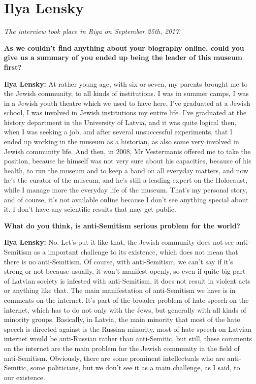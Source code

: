 \section{Ilya Lensky}

\textit{The interview took place in Riga on September 25th, 2017}.\par
\vspace*{2em}
\textbf{As we couldn’t find anything about your biography online, could you give us a summary of you ended up being the leader of this museum first?}

\textbf{Ilya Lensky:} At rather young age, with six or seven, my parents brought me to the Jewish community, to all kinds of institutions. I was in summer camps, I was in a Jewish youth theatre which we used to have here, I’ve graduated at a Jewish school, I was involved in Jewish institutions my entire life. I’ve graduated at the history department in the University of Latvia, and it was quite logical then, when I was seeking a job, and after several unsuccessful experiments, that I ended up working in the museum as a historian, as also some very involved in Jewish community life. And then, in 2008, Mr Vestermanis offered me to take the position, because he himself was not very sure about his capacities, because of his health, to run the museum and to keep a hand on all everyday matters, and now he’s the curator of the museum, and he’s still a leading expert on the Holocaust, while I manage more the everyday life of the museum. That’s my personal story, and of course, it’s not available online because I don’t see anything special about it. I don’t have any scientific results that may get public. 

\textbf{What do you think, is anti-Semitism serious problem for the world?}

\textbf{Ilya Lensky:} No. Let’s put it like that, the Jewish community does not see anti-Semitism as a important challenge to its existence, which does not mean that there is no anti-Semitism. Of course, with anti-Semitism, we can’t say if it’s strong or not because usually, it won’t manifest openly, so even if quite big part of Latvian society is infested with anti-Semitism, it does not result in violent acts or anything like that. The main manifestation of anti-Semitism we have is in comments on the internet. It’s part of the broader problem of hate speech on the internet, which has to do not only with the Jews, but generally with all kinds of minority groups. Basically, in Latvia, the main minority that most of the hate speech is directed against is the Russian minority, most of hate speech on Latvian internet would be anti-Russian rather than anti-Semitic, but still, these comments on the internet are the main problem for the Jewish community in the field of anti-Semitism. Obviously, there are some prominent intellectuals who are anti-Semitic, some politicians, but we don’t see it as a main challenge, as I said, to our existence. 


